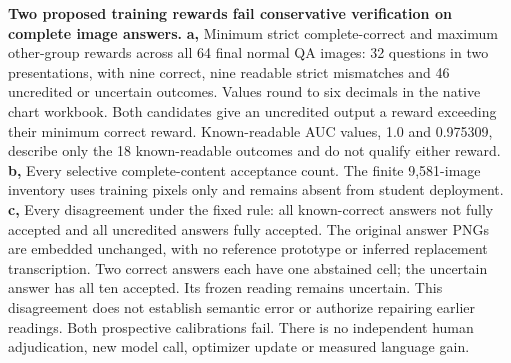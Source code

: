 \textbf{Two proposed training rewards fail conservative verification on complete image answers.}
\textbf{a,} Minimum strict complete-correct and maximum other-group rewards
across all 64 final normal QA images: 32 questions in two presentations, with
nine correct, nine readable strict mismatches and 46 uncredited or uncertain
outcomes. Values round to six decimals in the native chart workbook. Both
candidates give an uncredited output a reward exceeding their minimum correct
reward. Known-readable AUC values, 1.0 and 0.975309, describe only the 18
known-readable outcomes and do not qualify either reward. \textbf{b,} Every
selective complete-content acceptance count. The finite 9,581-image inventory
uses training pixels only and remains absent from student deployment.
\textbf{c,} Every disagreement under the fixed rule: all known-correct answers
not fully accepted and all uncredited answers fully accepted. The original
answer PNGs are embedded unchanged, with no reference prototype or inferred
replacement transcription. Two correct answers each have one abstained cell;
the uncertain answer has all ten accepted. Its frozen reading remains uncertain.
This disagreement does not establish semantic error or authorize repairing
earlier readings. Both prospective calibrations fail. There is no independent
human adjudication, new model call, optimizer update or measured language gain.
